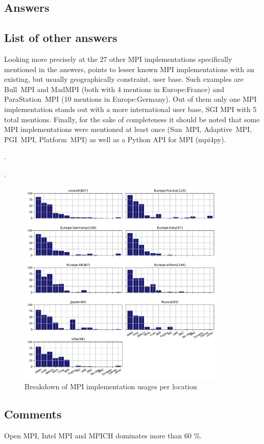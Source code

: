 
\subsection{Answers}


\subsection{List of other answers}

Looking more precisely at the 27 other MPI implementations
specifically mentioned in the answers, points to lesser known MPI
implementations with an existing, but usually geographically
constraint, user base. Such examples are Bull~MPI and MadMPI (both
with 4 mentions in Europe:France) and ParaStation~MPI (10 mentions in
Europe:Germany). Out of them only one MPI implementation stands out
with a more international user base, SGI MPI with 5 total
mentions. Finally, for the sake of completeness it should be noted
that some MPI implementations were mentioned at least once (Sun~MPI,
Adaptive~MPI, PGI~MPI, Platform~MPI) as well as a Python API for MPI
(mpi4py). 

.

.

\begin{report}
\begin{itemize}

\end{itemize}
\end{report}

\begin{figure}[htb]
\begin{center}
\includegraphics[width=10cm]{../pdfs/Q12.pdf}
\caption{Breakdown of MPI implementation usages per location}
\label{fig:Q12}
\end{center}
\end{figure}

\subsection{Comments}

Open MPI, Intel MPI and MPICH dominates more than 60 \%.

